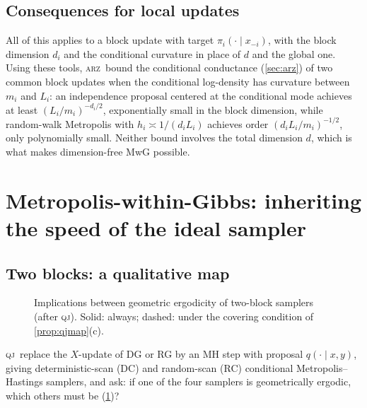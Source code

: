 \documentclass[11pt]{article}
\theoremstyle{remark}
\newcommand{\QJ}{\textsc{qj}}
\newcommand{\ARZ}{\textsc{arz}}
\begin{document}
\subsection{Consequences for local updates}
All of this applies to a block update with target $\pi_i(\cdot\mid x_{-i})$, with the block dimension $d_i$ and the conditional curvature in place of $d$ and the global one. Using these tools, \ARZ\ bound the conditional conductance (\cref{sec:arz}) of two common block updates when the conditional log-density has curvature between $m_i$ and $L_i$: an independence proposal centered at the conditional mode achieves at least $(L_i/m_i)^{-d_i/2}$, exponentially small in the block dimension, while random-walk Metropolis with $h_i\asymp1/(d_iL_i)$ achieves order $(d_iL_i/m_i)^{-1/2}$, only polynomially small. Neither bound involves the total dimension $d$, which is what makes dimension-free MwG possible.

\section{Metropolis-within-Gibbs: inheriting the speed of the ideal sampler}\label{sec:mwg}

\subsection{Two blocks: a qualitative map}\label{sec:qjmap}
\begin{figure}
\vspace{-14pt}
\centering
{}
\caption{Implications between geometric ergodicity of two-block samplers (after \QJ). Solid: always; dashed: under the covering condition of \cref{prop:qjmap}(c).}
\label{fig:qjmap}
\vspace{-10pt}
\end{figure}
\QJ\ replace the $X$-update of DG or RG by an MH step with proposal $q(\cdot\mid x,y)$, giving deterministic-scan (DC) and random-scan (RC) conditional Metropolis--Hastings samplers, and ask: if one of the four samplers is geometrically ergodic, which others must be (\cref{fig:qjmap})?
\end{document}
